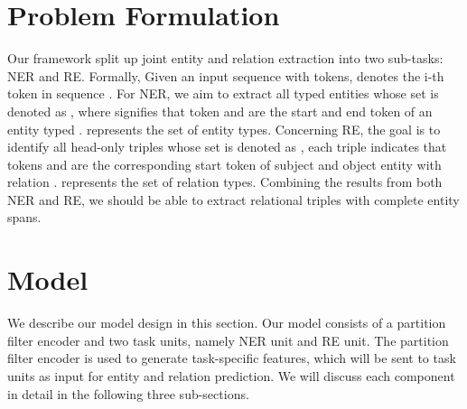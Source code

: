 \documentclass[11pt]{article}
\begin{document}
\section{Problem Formulation}
Our framework split up joint entity and relation extraction into two sub-tasks: NER and RE. Formally, Given an input sequence  with  tokens,  denotes the i-th token in sequence . For NER, we aim to extract all typed entities whose set is denoted as , where  signifies that token  and  are the start and end token of an entity typed .  represents the set of entity types. Concerning RE, the goal is to identify all head-only triples whose set is denoted as , each triple  indicates that tokens  and  are the corresponding start token of subject and object entity with relation .  represents the set of relation types. Combining the results from both NER and RE, we should be able to extract relational triples with complete entity spans.  

\begin{figure*}[htbp]
  \centering
  \vspace{-3.5mm}
  \hspace{-0.02\textwidth}
  \caption{\label{fig: model} (a) Overview of PFN. The framework consists of three components: partition filter encoder, NER unit and RE unit. In task units, we use table-filling for word pair prediction. Orange, yellow and green represents NER-related, shared and RE-related component or features. (b) Detailed depiction of partition filter encoder in one single time step. We decompose feature encoding into two steps: partition and filter (shown in the gray area). In partition, we first segment neurons into two task partitions and one shared partition. Then in filter, partitions are selected and combined to form task-specific features and shared features, filtering out information irrelevant to each task. }
  \vspace{-1.5mm}
\end{figure*}

\section{Model}
We describe our model design in this section. Our model consists of a partition filter encoder and two task units, namely NER unit and RE unit. The partition filter encoder is used to generate task-specific features, which will be sent to task units as input for entity and relation prediction. We will discuss each component in detail in the following three sub-sections.
\end{document}
